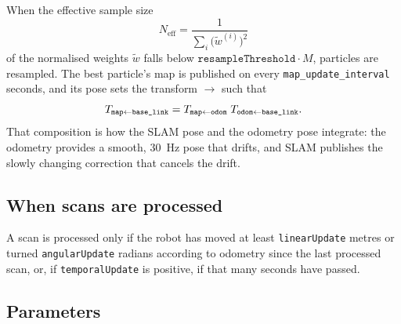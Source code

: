 When the effective sample size
\begin{equation}
N_{\mathrm{eff}} = \frac{1}{\sum_i \bigl(\tilde w^{(i)}\bigr)^2}
\end{equation}
of the normalised weights $\tilde w$ falls below
$\texttt{resampleThreshold}\cdot M$, particles are resampled. The best
particle's map is published on  every
\texttt{map\_update\_interval} seconds, and its pose sets the transform
$\to$ such that
\begin{equation}
T_{\texttt{map}\leftarrow\texttt{base\_link}} =
T_{\texttt{map}\leftarrow\texttt{odom}}\;T_{\texttt{odom}\leftarrow\texttt{base\_link}} .
\end{equation}
That composition is how the SLAM pose and the odometry pose integrate: the
odometry provides a smooth, \SI{30}{Hz} pose that drifts, and SLAM publishes
the slowly changing correction that cancels the drift.

\subsection{When scans are processed}

A scan is processed only if the robot has moved at least
\texttt{linearUpdate} metres or turned \texttt{angularUpdate} radians
according to odometry since the last processed scan, or, if
\texttt{temporalUpdate} is positive, if that many seconds have passed.

\subsection{Parameters}

